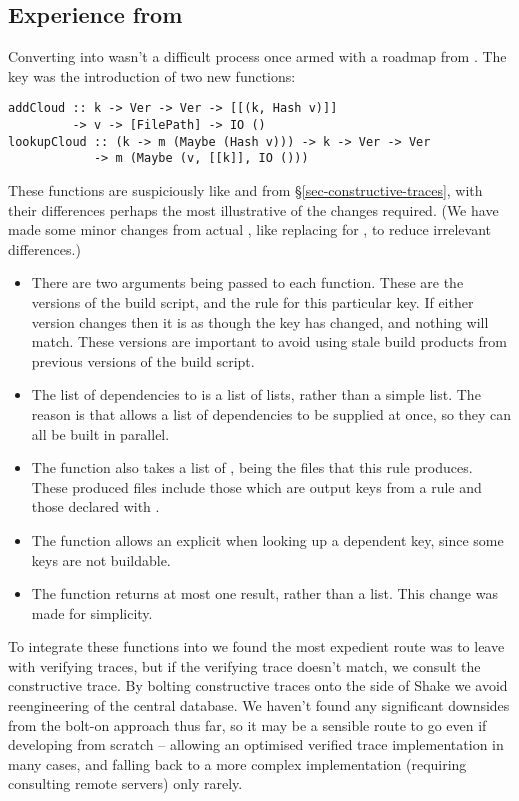 {\subsection{Experience from \Cloud \Shake}\label{sec-cloud-shake}

Converting \Shake into \Cloud \Shake wasn't a difficult process once armed with a roadmap from \cite{mokhov2018buildsystems}. The key was the introduction of two new functions:

\begin{verbatim}
addCloud :: k -> Ver -> Ver -> [[(k, Hash v)]]
         -> v -> [FilePath] -> IO ()
lookupCloud :: (k -> m (Maybe (Hash v))) -> k -> Ver -> Ver
            -> m (Maybe (v, [[k]], IO ()))
\end{verbatim}

These functions are suspiciously like  and  from \S\ref{sec-constructive-traces}, with their differences perhaps the most illustrative of the changes required. (We have made some minor changes from actual \Shake, like replacing  for , to reduce irrelevant differences.)

\begin{itemize}
\item There are two  arguments being passed to each function. These are the versions of the build script, and the rule for this particular key. If either version changes then it is as though the key has changed, and nothing will match. These versions are important to avoid using stale build products from previous versions of the build script.
\item The list of dependencies to  is a list of lists, rather than a simple list. The reason is that \Shake allows a list of dependencies to be supplied at once, so they can all be built in parallel.
\item The  function also takes a list of , being the files that this rule produces. These produced files include those which are output keys from a rule and those declared with .
\item The  function allows an explicit  when looking up a dependent key, since some keys are not buildable.
\item The  function returns at most one result, rather than a list. This change was made for simplicity.
\end{itemize}

To integrate these functions into \Shake we found the most expedient route was to leave \Shake with verifying traces, but if the verifying trace doesn't match, we consult the constructive trace. By bolting constructive traces onto the side of Shake we avoid reengineering of the central database. We haven't found any significant downsides from the bolt-on approach thus far, so it may be a sensible route to go even if developing from scratch -- allowing an optimised verified trace implementation in many cases, and falling back to a more complex implementation (requiring consulting remote servers) only rarely.

}
